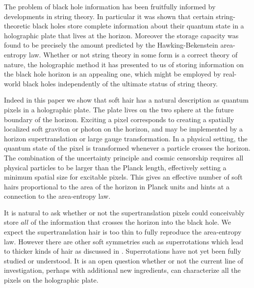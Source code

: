 \documentclass[12pt]{article}
\numberwithin{equation}{section}
\begin{document}
The problem of black hole information has been fruitfully informed by developments in string theory. In particular it was shown \cite{sv} that certain string-theoretic black holes store complete information about their quantum state in a holographic plate that lives at the horizon. Moreover the storage capacity was found to be precisely the amount predicted by the Hawking-Bekenstein area-entropy law.  Whether or not string theory in some form is  a correct theory of nature, the holographic method it has presented to us of storing information on the black hole horizon is an appealing one, which might be employed by real-world black holes independently of the ultimate status of string theory. 

Indeed in this paper we show that soft hair has a natural description as quantum pixels in a holographic plate. The plate  lives on the two sphere at the future boundary of the horizon. Exciting a pixel corresponds to creating a spatially localized soft graviton or photon on the horizon, and may be implemented by a horizon supertranslation or large gauge transformation.
In a physical setting, the  quantum state of the pixel is transformed whenever a particle crosses the horizon. The combination of the uncertainty principle and cosmic censorship requires all physical particles to be larger than the Planck length, effectively setting a minimum 
spatial size for excitable  pixels. This gives an effective number of soft hairs proportional to the area of the horizon in Planck units and hints at a connection to the area-entropy law. 

It is natural to ask whether or not the supertranslation pixels could conceivably store $all$ of the information that crosses the horizon into the black hole.  We expect the supertranslation hair is too thin to  fully reproduce the area-entropy law. However there are other soft symmetries such as superrotations \cite{deBoer:2003vf,Banks:2003vp,Barnich:2010eb,
  Cachazo:2014fwa, Kapec:2014opa} which lead to thicker kinds of hair as discussed in \cite{Pasterski:2015tva}. Superrotations have not yet been fully studied or understood. It is an open question whether or not the current line of investigation, perhaps with additional new ingredients,  can characterize all the pixels on the holographic plate. 
\end{document}

